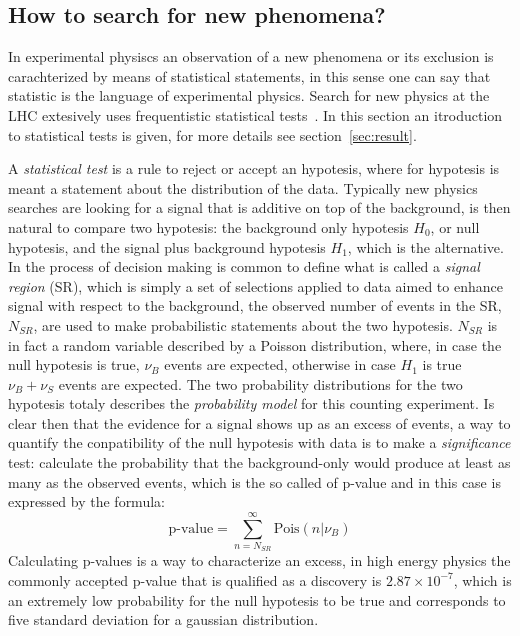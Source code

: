 \subsection{How to search for new phenomena?} \label{sec:stat1} 
In experimental physiscs  an observation of a new phenomena or its exclusion  is 
carachterized by means of statistical statements, in this sense one can say that statistic is the language 
of experimental physics.
Search for new physics at the LHC extesively uses frequentistic statistical tests~\cite{LHCstat}.
In this section an itroduction to statistical tests is given, for more details see section~\ref{sec:result}.
 
A \emph{statistical test} is a rule to reject or accept an hypotesis, where for hypotesis is meant 
a statement about the distribution of the data. Typically new physics searches are looking for a signal 
that is additive on top of the background, is then natural to compare two hypotesis:
the background only hypotesis $H_{0}$, or null hypotesis, and the signal plus background hypotesis $H_{1}$, which is the alternative.
In the process of decision making is common to define what is called a \emph{signal region} (SR), which is simply
a set of selections applied to data aimed to enhance signal with respect to the background, 
the observed number of events in the SR, $N_{SR}$,  are used to make probabilistic statements about the two hypotesis.
$N_{SR}$  is in fact a random
variable described by a Poisson distribution, where, in case the null hypotesis is true, $\nu_{B}$ events are expected, otherwise 
in case $H_1$ is true $\nu_{B} + \nu_{S}$ events are expected. The two probability distributions for the two hypotesis
totaly describes the \emph{probability model} for this counting experiment.
%
Is clear then that the evidence for a signal shows up as an excess of 
events, a way to quantify the conpatibility of the null hypotesis with data
is to make a \emph{significance} test: calculate the probability that 
the background-only would produce at least as many
as the observed events, which is the so called of p-value and in this case is expressed by the formula:
$$
\text{p-value} = \sum_{n=N_{SR}}^{\infty} \text{Pois}(n|\nu_{B})
$$
Calculating  p-values is a way to characterize an excess, in high energy physics the commonly accepted p-value that is
qualified as a discovery is $2.87 \times 10^{-7}$, which is an extremely low probability for the null hypotesis to be true
and corresponds to five standard deviation for a gaussian distribution. 

